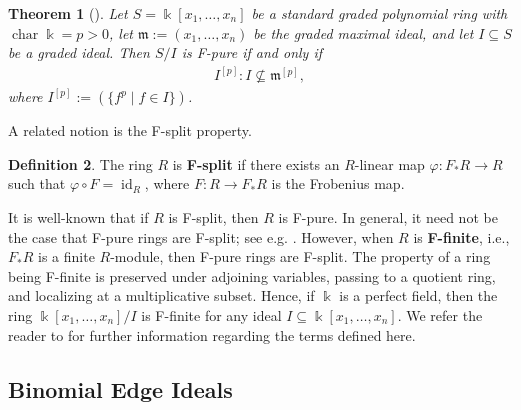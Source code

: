 \documentclass[12pt,a4paper]{amsart}
\theoremstyle{plain}
\newtheorem{thrm}{Theorem}[section]
\def\bthm{\begin{thrm}}
\def\ethm{\end{thrm}}
\theoremstyle{definition}
\newtheorem{defn}[thrm]{Definition}
\def\bdefn{\begin{defn}}
\def\edefn{\end{defn}}
\theoremstyle{remark}
\let\ra=\rightarrow
\def\k{\Bbbk}
\def\m{\mathfrak{m}}
\DeclareMathOperator{\id}{id}
\DeclareMathOperator{\fchar}{char}
\renewcommand{\subset}{\subseteq}
\begin{document}
\bthm[{\cite[Theorem 1.12]{fedder1983}}]
\label{thm:fedder_criterion}
Let $S = \k[x_{1},\ldots,x_{n}]$ be a standard graded polynomial ring with $\fchar \k = p > 0$, let $\m := (x_{1},\ldots,x_{n})$ be the graded maximal ideal, and let $I \subset S$ be a graded ideal. Then $S/I$ is F-pure if and only if
\begin{align*}
    I^{[p]} : I \not\subset \m^{[p]},
\end{align*}
where $I^{[p]} := ( \{f^{p} \mid f \in I\} )$.
\ethm 

A related notion is the F-split property. 
\bdefn
\label{defn:f_split}
The ring $R$ is \textbf{F-split} if there exists an $R$-linear map $\varphi : F_{\ast}R \ra R$ such that $\varphi \circ F = \id_{R}$, where $F : R \ra F_{\ast}R$ is the Frobenius map.
\edefn 

It is well-known that if $R$ is F-split, then $R$ is F-pure. In general, it need not be the case that F-pure rings are F-split; see e.g. \cite[Proposition 3.71]{Rotman09}. However, when $R$ is \textbf{F-finite}, i.e., $F_{\ast}R$ is a finite $R$-module, then F-pure rings are F-split. The property of a ring being F-finite is preserved under adjoining variables, passing to a quotient ring, and localizing at a multiplicative subset. Hence, if $\k$ is a perfect field, then the ring $\k[x_{1},\ldots,x_{n}]/I$ is F-finite for any ideal $I \subset \k[x_{1},\ldots,x_{n}]$. We refer the reader to \cite{ma2021f} for further information regarding the terms defined here.

\subsection{Binomial Edge Ideals}
\end{document}
